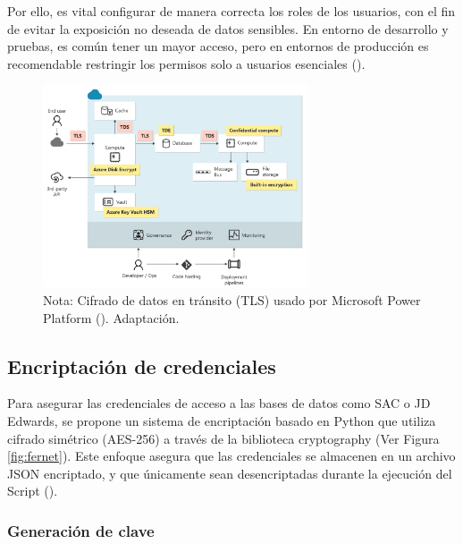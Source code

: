 \documentclass[letter,oneside,12pt,spanish]{report}
\begin{document}
\noindent Por ello, es vital configurar de manera correcta los roles de los usuarios, con el fin de evitar la exposición no deseada de datos sensibles. En entorno de desarrollo y pruebas, es común tener un mayor acceso, pero en entornos de producción es recomendable restringir los permisos solo a usuarios esenciales (\cite{microsoft2024environments}).

\begin{figure}[ht]
    \centering
    \includegraphics[width=0.7\textwidth]{Figs/TLS.png}
    \label{fig:tls}
    \\Nota:  Cifrado de datos en tránsito (TLS) usado por Microsoft Power Platform (\cite{microsoft2024encryption}). Adaptación.
\end{figure}


\subsection{Encriptación de credenciales}

\noindent Para asegurar las credenciales de acceso a las bases de datos como SAC o JD Edwards, se propone un sistema de encriptación basado en Python que utiliza cifrado simétrico (AES-256) a través de la biblioteca cryptography (Ver Figura \ref{fig:fernet}). Este enfoque asegura que las credenciales se almacenen en un archivo JSON encriptado, y que únicamente sean desencriptadas durante la ejecución del Script (\cite{microsoft2023securitygovernance}).

\subsubsection{Generación de clave}
\end{document}
